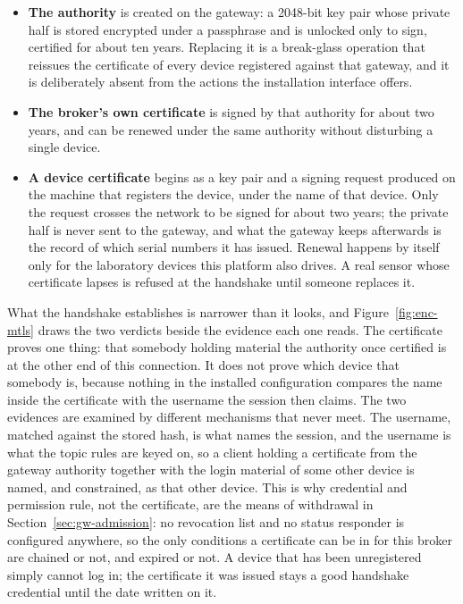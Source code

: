 \documentclass[12pt,a4paper]{report}
\begin{document}
\begin{itemize}
    \item \textbf{The authority} is created on the gateway: a 2048-bit key
    pair whose private half is stored encrypted under a passphrase and is
    unlocked only to sign, certified for about ten years. Replacing it is a
    break-glass operation that reissues the certificate of every device
    registered against that gateway, and it is deliberately absent from the
    actions the installation interface offers.
    \item \textbf{The broker's own certificate} is signed by that authority
    for about two years, and can be renewed under the same authority without
    disturbing a single device.
    \item \textbf{A device certificate} begins as a key pair and a signing
    request produced on the machine that registers the device, under the name
    of that device. Only the request crosses the network to be signed for
    about two years; the private half is never sent to the gateway, and what
    the gateway keeps afterwards is the record of which serial numbers it has
    issued. Renewal happens by itself only for the laboratory devices this
    platform also drives. A real sensor whose certificate lapses is refused
    at the handshake until someone replaces it.
\end{itemize}

What the handshake establishes is narrower than it looks, and
Figure~\ref{fig:enc-mtls} draws the two verdicts beside the evidence each one
reads. The certificate proves one thing: that somebody holding material the
authority once certified is at the other end of this connection. It does not
prove which device that somebody is, because nothing in the installed
configuration compares the name inside the certificate with the username the
session then claims. The two evidences are examined by different mechanisms
that never meet. The username, matched against the stored hash, is what names
the session, and the username is what the topic rules are keyed on, so a
client holding a certificate from the gateway authority together with the
login material of some other device is named, and constrained, as that other
device. This is why credential and permission rule, not the certificate, are
the means of withdrawal in Section~\ref{sec:gw-admission}: no revocation list
and no status responder is configured anywhere, so the only conditions a
certificate can be in for this broker are chained or not, and expired or not.
A device that has been unregistered simply cannot log in; the certificate it
was issued stays a good handshake credential until the date written on it.
\end{document}
